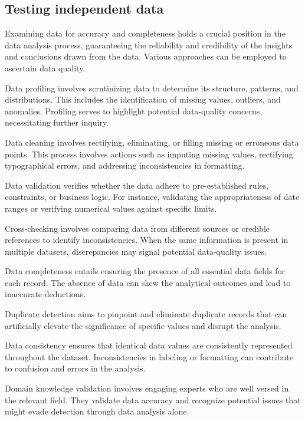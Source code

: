 
\subsection{Testing independent data}
\label{sub:testing_independent_data}

Examining data for accuracy and completeness holds a crucial position in the data analysis process, guaranteeing the reliability and credibility of the insights and conclusions drawn from the data. Various approaches can be employed to ascertain data quality.

Data profiling involves scrutinizing data to determine its structure, patterns, and distributions. This includes the identification of missing values, outliers, and anomalies. Profiling serves to highlight potential data-quality concerns, necessitating further inquiry.

Data cleaning involves rectifying, eliminating, or filling missing or erroneous data points. This process involves actions such as imputing missing values, rectifying typographical errors, and addressing inconsistencies in formatting.

Data validation verifies whether the data adhere to pre-established rules, constraints, or business logic. For instance, validating the appropriateness of date ranges or verifying numerical values against specific limits.

Cross-checking involves comparing data from different sources or credible references to identify inconsistencies. When the same information is present in multiple datasets, discrepancies may signal potential data-quality issues.

Data completeness entails ensuring the presence of all essential data fields for each record. The absence of data can skew the analytical outcomes and lead to inaccurate deductions.

Duplicate detection aims to pinpoint and eliminate duplicate records that can artificially elevate the significance of specific values and disrupt the analysis.

Data consistency ensures that identical data values are consistently represented throughout the dataset. Inconsistencies in labeling or formatting can contribute to confusion and errors in the analysis.

Domain knowledge validation involves engaging experts who are well versed in the relevant field. They validate data accuracy and recognize potential issues that might evade detection through data analysis alone.


